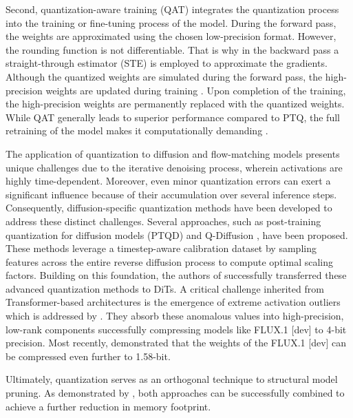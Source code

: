 Second, quantization-aware training (\gls{QAT}) \cite{esser2019learned,he2023efficientdm} integrates the quantization process into the training or fine-tuning process of the model. During the forward pass, the weights are approximated using the chosen low-precision format. However, the rounding function is not differentiable. That is why in the backward pass a straight-through estimator (\gls{STE}) \cite{bengio2013estimating} is employed to approximate the gradients. Although the quantized weights are simulated during the forward pass, the high-precision weights are updated during training \cite{jacob2018quantization,courbariaux2015binaryconnect}. Upon completion of the training, the high-precision weights are permanently replaced with the quantized weights. While \gls{QAT} generally leads to superior performance compared to \gls{PTQ}, the full retraining of the model makes it computationally demanding \cite{gholami2022survey}.

The application of quantization to diffusion and flow-matching models presents unique challenges due to the iterative denoising process, wherein activations are highly time-dependent. Moreover, even minor quantization errors can exert a significant influence because of their accumulation over several inference steps. Consequently, diffusion-specific quantization methods have been developed to address these distinct challenges. Several approaches, such as post-training quantization for diffusion models (\gls{PTQD}) \cite{PTQD} and Q-Diffusion \cite{QDiffusion}, have been proposed. These methods leverage a timestep-aware calibration dataset by sampling features across the entire reverse diffusion process to compute optimal scaling factors. Building on this foundation, the authors of \cite{QDiT} successfully transferred these advanced quantization methods to \gls{DiT}s. A critical challenge inherited from Transformer-based architectures is the emergence of extreme activation outliers which is addressed by \cite{li2024svdquant}. They absorb these anomalous values into high-precision, low-rank components successfully compressing models like FLUX.1 [dev] to 4-bit precision. Most recently, \cite{FluxBit} demonstrated that the weights of the FLUX.1 [dev] can be compressed even further to 1.58-bit. 


Ultimately, quantization serves as an orthogonal technique to structural model pruning. As demonstrated by \cite{qu2025automatic}, both approaches can be successfully combined to achieve a further reduction in memory footprint.

